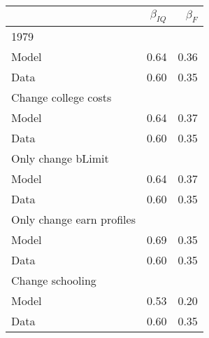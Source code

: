 \begin{tabular}{lrr}
\hline
  & $\beta_{IQ}$  & $\beta_{F}$  \\ 
\hline
1979 &   &   \\ 
Model & 0.64  & 0.36  \\ 
Data & 0.60  & 0.35  \\ 
Change college costs &   &   \\ 
Model & 0.64  & 0.37  \\ 
Data & 0.60  & 0.35  \\ 
Only change bLimit &   &   \\ 
Model & 0.64  & 0.37  \\ 
Data & 0.60  & 0.35  \\ 
Only change earn profiles &   &   \\ 
Model & 0.69  & 0.35  \\ 
Data & 0.60  & 0.35  \\ 
Change schooling &   &   \\ 
Model & 0.53  & 0.20  \\ 
Data & 0.60  & 0.35  \\ 
\hline
\end{tabular}%
